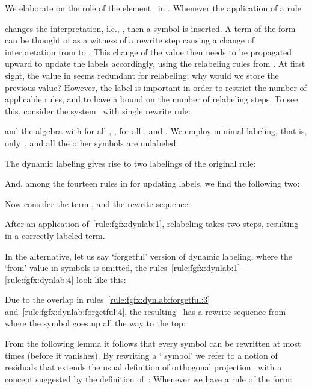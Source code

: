 \begin{remark}
\newcommand{\ssrelabelto}{\ssrelabel}\newcommand{\srelabelto}{\super{\ssrelabelto}}\newcommand{\relabelto}[1]{\funap{\srelabelto{#1}}}\newcommand{\fgfxnr}{8}\newcommand{\trsfgfx}{\iatrs{\fgfxnr}}\newcommand{\algfgfx}{\iaalg{\fgfxnr}}We elaborate on the role of the element~ in .
  Whenever the application of a rule 
   
  changes the interpretation,
  i.e., ,
  then a symbol  is inserted.
  A term of the form  can be thought of as a witness 
  of a rewrite step  
  causing a change of interpretation from  to .
  This change of the value then needs to be propagated upward to update the labels accordingly,
  using the relabeling rules from .
  At first sight, the value  in  seems redundant for relabeling:
  why would we store the previous value? 
  However, the label  is important in order to restrict the number of applicable rules,
  and to have a bound on the number of relabeling steps. 
  To see this, consider the system~ with single rewrite rule:

  and the algebra  with
   for all ,
  ,  for all ,
  and .
  We employ minimal labeling, that is, 
  only \,,
  and all the other symbols are unlabeled.
  
  The dynamic labeling  gives rise to two labelings of the original rule:
  
  And, among the fourteen rules in  for updating labels,
  we find the following two:
  

  \noindent
  Now consider the term ,
and the rewrite sequence:
  
  After an application of~\eqref{rule:fgfx:dynlab:1}, relabeling takes two steps,
  resulting in a correctly labeled term.

  In the alternative, let us say `forgetful' version of dynamic labeling,
  where the `from' value  in symbols  is omitted,
  the rules~\eqref{rule:fgfx:dynlab:1}--\eqref{rule:fgfx:dynlab:4} look like this:
  
Due to the overlap in rules~\eqref{rule:fgfx:dynlab:forgetful:3} and~\eqref{rule:fgfx:dynlab:forgetful:4},
  the resulting \csTRS\ has a rewrite sequence 
  from  where the symbol  goes up all the way to the top:
  
\end{remark}





From the following lemma it follows that every  symbol
can be rewritten at most  times (before it vanishes).
By rewriting a ` symbol' we refer to a notion of
residuals that extends the usual definition of orthogonal projection~\cite{terese:03}
with a concept suggested by the definition of \,:
Whenever we have a rule of the form:

